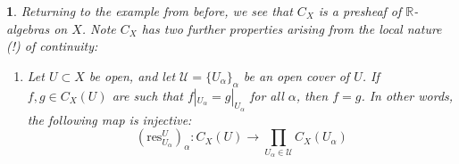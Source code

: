 \documentclass[12pt]{article}
\newtheorem{para}[theorem]{}
\begin{document}
\begin{para}
	Returning to the example from before, we see that $C_X$ is a presheaf of $\mathbb{R}$-algebras on $X$. Note $C_X$ has two further properties arising from the local nature (!) of continuity:
	\begin{enumerate}[label=S\arabic*.,ref=S\arabic*]
		\item\label{sheaf_local_determination} Let $U\subset X$ be open, and let $\mathcal{U}=\{U_\alpha\}_\alpha$ be an open cover of $U$. If $f,g\in C_X(U)$ are such that $f|_{U_\alpha}=g|_{U_\alpha}$ for all $\alpha$, then $f=g$. In other words, the following map is injective: 
			\begin{equation*}
				(\text{res}^U_{U_\alpha})_\alpha: C_X(U) \to \prod_{U_\alpha\in\mathcal{U}} C_X(U_\alpha)
			\end{equation*}


\end{enumerate}
\end{para}
\end{document}

